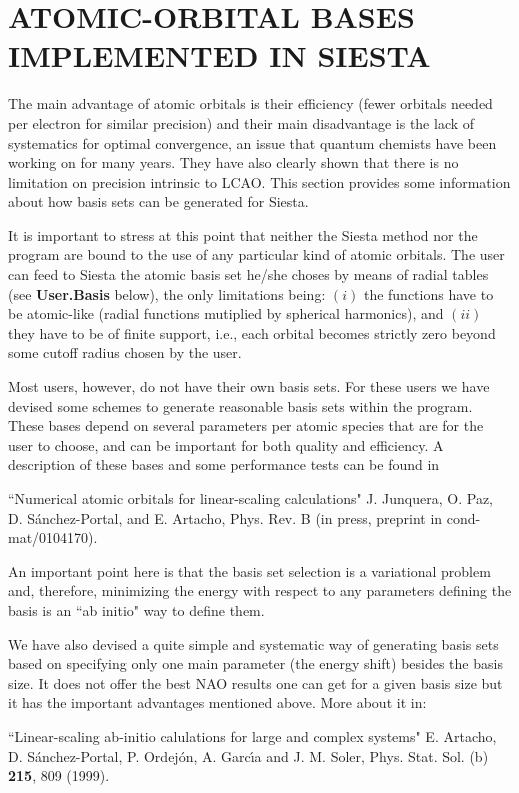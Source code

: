 \documentclass[11pt]{article}
\begin{document}
\section{ATOMIC-ORBITAL BASES IMPLEMENTED IN SIESTA}

The main advantage of atomic orbitals is their efficiency (fewer orbitals 
needed per electron for similar precision) 
and their main disadvantage is the lack of systematics for optimal 
convergence, an issue that quantum chemists have been working on for
many years. They have also clearly shown that there
is no limitation on precision intrinsic to LCAO.
This section provides some information about how basis sets can be
generated for {\sc Siesta}.

It is important to stress at this point that neither the {\sc Siesta} 
method nor the program
are bound to the use of any particular kind of atomic orbitals. The
user can feed to {\sc Siesta} the atomic basis set he/she choses by
means of radial tables (see {\bf User.Basis} below), the
only limitations being: $(i)$ the functions have to be atomic-like (radial 
functions mutiplied by spherical harmonics), and $(ii)$ they have to be
of finite support, i.e., each orbital becomes strictly zero beyond some
cutoff radius chosen by the user.

Most users, however, do not have their own basis sets. For these users
we have devised some schemes to generate reasonable basis sets within
the program. These bases depend on several parameters per atomic
species that are for the user to choose, and can be important for both
quality and efficiency. A description of these bases and some
performance tests can be found in

\noindent
``Numerical atomic orbitals for linear-scaling calculations"
J. Junquera, O. Paz, D. S\'anchez-Portal, and E. Artacho, Phys. Rev. B
(in press, preprint in cond-mat/0104170). 

An important point here is that the basis set selection is a 
variational problem and, therefore, minimizing the energy with respect
to any parameters defining the basis is an ``ab initio" way to 
define them.

We have also devised a quite simple and systematic way of generating 
basis sets based on specifying only one main parameter (the energy shift)
besides the basis size. It does not offer the best NAO results one can get 
for a given basis size but it has the important advantages mentioned above. 
More about it in:

\noindent
``Linear-scaling ab-initio calulations for large and complex systems"
E. Artacho, D. S\'anchez-Portal, P. Ordej\'on, A. Garc\'{\i}a and
J. M. Soler, Phys. Stat. Sol. (b) {\bf 215}, 809 (1999).
\end{document}
